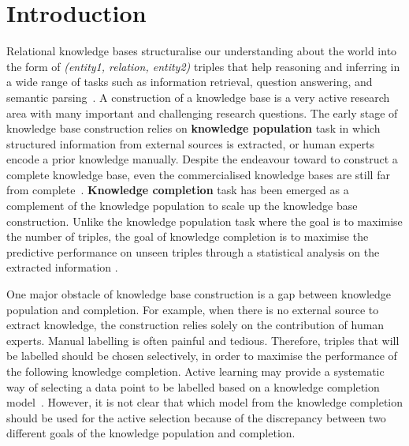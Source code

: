 
\section{Introduction}
\label{sec:intro}

Relational knowledge bases structuralise our understanding about the world into the form of \textit{(entity1, relation, entity2)} triples
that help reasoning and inferring in a wide range of tasks such as information retrieval, question answering, and semantic parsing~\cite{Dong2015,jiang2015improving,kim2013context,sondhi2014mining}.
A construction of a knowledge base is a very active research area with many important and challenging research questions.
The early stage of knowledge base construction relies on {\bf knowledge population} task
in which structured information from external sources is extracted, 
or human experts encode a prior knowledge manually.
Despite the endeavour toward to construct a complete knowledge base, 
even the commercialised knowledge bases are still far from complete~\cite{dong2014knowledge}. 
{\bf Knowledge completion} task has been emerged as a complement of the knowledge population 
to scale up the knowledge base construction. Unlike the knowledge population task where the goal is to maximise the number of triples, the goal of knowledge completion is to maximise the predictive performance on unseen triples through a statistical analysis on the extracted information \cite{guu2015traversing,Lao2010}.

One major obstacle of knowledge base construction is a gap between knowledge 
population and completion. For example, when there is no external source to extract knowledge,
the construction relies solely on the contribution of human experts.
Manual labelling is often painful and tedious. 
Therefore, triples that will be labelled should be chosen selectively, in order to maximise the performance of the following knowledge completion.
Active learning may provide a systematic way of selecting a data point to be labelled based on a knowledge completion model~\cite{Settles2010}. However, it is not clear that which model from the knowledge completion should be used for the active selection because of the discrepancy between two different goals of the knowledge population and completion.

